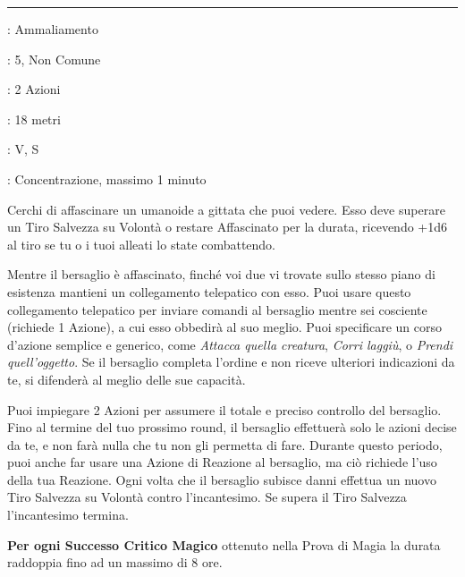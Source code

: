 \begin{multicols}{2}
\smallskip\noindent\rule{\linewidth}{2pt} \hypertarget{Dominare Persone}{}\medskip{}
\noindent
\begin{description}[noitemsep, topsep=0pt, parsep=0pt, partopsep=0pt, leftmargin=0cm, labelwidth=2.8cm]
	\item[\textbf{Lista di Magia}]: Ammaliamento
	\item[\textbf{Livello}]: 5, Non Comune
	\item[\textbf{T. di Lancio}]: 2 Azioni
	\item[\textbf{Gittata}]: 18 metri
	\item[\textbf{Componenti}]: V, S
	\item[\textbf{Durata}]: Concentrazione, massimo 1 minuto
\end{description}

Cerchi di affascinare un umanoide a gittata che puoi vedere. Esso deve superare un Tiro Salvezza su Volontà o restare Affascinato per la durata, ricevendo +1d6 al tiro se tu o i tuoi alleati lo state combattendo.

Mentre il bersaglio è affascinato, finché voi due vi trovate sullo stesso piano di esistenza mantieni un collegamento telepatico con esso. Puoi usare questo collegamento telepatico per inviare comandi al bersaglio mentre sei cosciente (richiede 1 Azione), a cui esso obbedirà al suo meglio. Puoi specificare un corso d'azione semplice e generico, come \emph{Attacca quella creatura}, \emph{Corri laggiù}, o \emph{Prendi quell'oggetto}. Se il bersaglio completa l'ordine e non riceve ulteriori indicazioni da te, si difenderà al meglio delle sue capacità.

Puoi impiegare 2 Azioni per assumere il totale e preciso controllo del bersaglio. Fino al termine del tuo prossimo round, il bersaglio effettuerà solo le azioni decise da te, e non farà nulla che tu non gli permetta di fare. Durante questo periodo, puoi anche far usare una Azione di Reazione al bersaglio, ma ciò richiede l'uso della tua Reazione. Ogni volta che il bersaglio subisce danni effettua un nuovo Tiro Salvezza su Volontà contro l'incantesimo. Se supera il Tiro Salvezza l'incantesimo termina.

\textbf{Per ogni Successo Critico Magico} ottenuto nella Prova di Magia la durata raddoppia fino ad un massimo di 8 ore.


\end{multicols}
